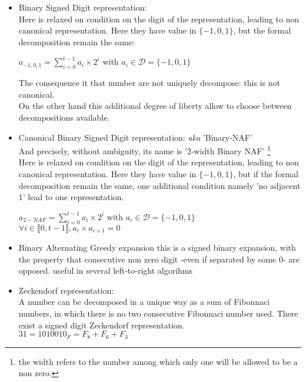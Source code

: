 \begin{itemize}
	\item Binary Signed Digit representation:\\
			Here is relaxed on condition on the digit of the representation, leading to non canonical representation.
			Here they have value in $\{-1, 0 , 1\}$, but the formal decomposition remain the same:
			\begin{center}
				\begin{small}
							$ a_{-1, 0 , 1} = \sum \limits_{i=0}^{t-1} a_i \times 2^i$  with $a_i \in \mathcal{D} =\{ -1,0,1\}$ \\
				\end{small}
			\end{center}
			The consequence it that number are not uniquely decompose: 	this is not canonical. 	\\
			On the other hand this additional degree of liberty allow to choose between	decompositions available.	

	\item Canonical Binary Signed Digit representation: \textit{aka} 'Binary-NAF'\\
			And precisely, without ambiguity, its name is '2-width Binary NAF'
\footnote{the width refers to the number among which only one will be allowed to be a non zero.}\\
			Here is relaxed on condition on the digit of the representation, leading to non canonical representation.
			Here they have value in $\{-1, 0 , 1\}$, but if the formal decomposition remain the same, one additional condition
			namely 'no adjacent 1' lead to one representation.
			\begin{center}
				\begin{small}
					$ a_{2-NAF} = \sum \limits_{i=0}^{t-1} a_i \times 2^i$  with $a_i \in \mathcal{D} =\{ -1,0,1\}$ \\
		    	 $\forall i \in \llbracket 0,t-1 \rrbracket,   a_i \times a_{i+1} =0$
				\end{small}			
			\end{center}	

		\item Binary Alternating Greedy expansion	
		this is a signed binary expansion, with the property that consecutive
		non zero digit -even if separated by some 0- are opposed.
		useful in several left-to-right algorihms

		\item Zeckendorf representation:\\
		A number can be decomposed in a unique way as a sum of Fibonnaci numbers,
		in which there is no two consecutive Fibonnaci number used.
		There exist a signed digit Zeckendorf representation.\\
		$31 = {1010010}_F = F_8 + F_6 + F_3$
		\end{itemize}



